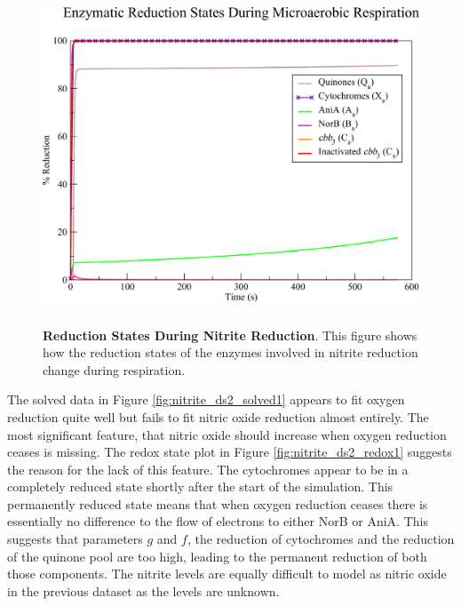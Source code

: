 \begin{figure}[tbp]
 \centering
 \includegraphics[height=10cm, clip=true]{./07-nitritereduction/data/dataset1redox-1.pdf}
 \caption[Reduction States During Nitrite Reduction]{{\bf Reduction States During Nitrite Reduction}. This figure shows how the reduction states of the enzymes involved in nitrite reduction change during respiration.
  \label{fig:nitrite_ds1_redox1}}
\end{figure}

The solved data in Figure \ref{fig:nitrite_ds2_solved1} appears to fit oxygen reduction quite well but fails to fit nitric oxide reduction almost entirely. The most significant feature, that nitric oxide should increase when oxygen reduction ceases is missing. The redox state plot in Figure \ref{fig:nitrite_ds2_redox1} suggests the reason for the lack of this feature. The cytochromes appear to be in a completely reduced state shortly after the start of the simulation. This permanently reduced state means that when oxygen reduction ceases there is essentially no difference to the flow of electrons to either NorB or AniA. This suggests that parameters $g$ and $f$, the reduction of cytochromes and the reduction of the quinone pool are too high, leading to the permanent reduction of both those components. The nitrite levels are equally difficult to model as nitric oxide in the previous dataset as the levels are unknown.

